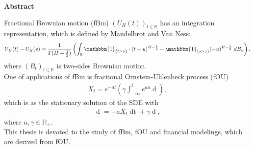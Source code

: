 \documentclass[a4paper, twoside, 11pt]{article}
\theoremstyle{definition}
\newcommand{\brkt}[1]{\left({#1} \right)}
\renewenvironment{abstract}{
	\begin{center}
		  \Large
		  \textbf{Abstract}
		  \hspace{2em}
	\end{center}				
  }{}
\begin{document}
  
  \newpage

  \thispagestyle{empty}
  \begin{abstract}
  Fractional Brownian motion (fBm) $(U_H(t))_{t\in \mathbb{R}}$ has an integration representation, which is defined by Mandelbrot and Van Ness\cite{mandelbrot}:
\begin{eqnarray*}
 	U_H(t) - U_H(s) = \frac{1}{\Gamma(H+\frac{1}{2})}\brkt{\int_{\mathbb{R}} \mathbbm{1}_{\{t > u\}}\cdot (t-u)^{H-\frac{1}{2}} - \mathbbm{1}_{\{s > u\}} (-u)^{H-\frac{1}{2}} \, \mathop{dB_u}},
\end{eqnarray*}
where $(B_t)_{t\in\mathbb{R}}$ is two-sides Brownian motion.\\
One of applications of fBm is fractional Ornstein-Uhlenbeck process (fOU) 
\begin{eqnarray*}
  X_t = e^{-at}\brkt{\gamma\int_{-\infty}^t e^{au}\mathop{dU_H(u)}},
\end{eqnarray*}
which is as the stationary solution of the SDE with 
\begin{eqnarray*}
  \mathop{dX_t} = -aX_t\mathop{dt} + \gamma\mathop{dU_H(t)},
\end{eqnarray*}
where $a,\gamma \in \mathbb{R}_+$.\\
This thesis is devoted to the study of fBm, fOU and financial modelings, which are derived from fOU.

  \end{abstract}
\newpage

\thispagestyle{empty}
\mbox{}
\newpage
\fancyhead[LO, RE]{}
\fancyfoot[LE, RO]{}
\tableofcontents
\newpage
\thispagestyle{empty}
\mbox{}
\newpage

\fancyhead[RO]{\leftmark}
\fancyhead[LE]{\rightmark}
\fancyfoot[LE, RO]{\large \thepage}
\setcounter{section}{0}
\setcounter{page}{1}
\end{document}
